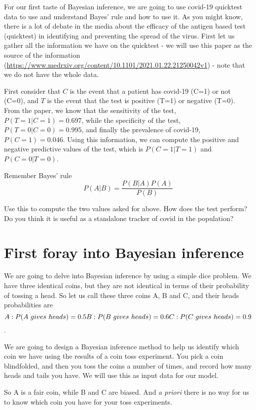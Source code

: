 \documentclass[
]{book}
\begin{document}
For our first taste of Bayesian inference, we are going to use covid-19 quicktest data to use and understand Bayes' rule and how to use it. As you might know, there is a lot of debate in the media about the efficacy of the antigen based test (quicktest) in identifying and preventing the spread of the virus. First let us gather all the information we have on the quicktest - we will use this paper as the source of the information (\url{https://www.medrxiv.org/content/10.1101/2021.01.22.21250042v1}) - note that we do not have the whole data.

First consider that \(C\) is the event that a patient has covid-19 (C=1) or not (C=0), and \(T\) is the event that the test is positive (T=1) or negative (T=0).
From the paper, we know that the sensitivity of the test, \(P(T=1 | C=1) = 0.697\), while the specificity of the test, \(P(T=0 | C=0) = 0.995\), and finally the prevalence of covid-19, \(P(C=1) = 0.046\). Using this information, we can compute the positive and negative predictive values of the test, which is \(P(C=1 | T=1)\) and \(P(C=0 | T=0)\).

Remember Bayes' rule \[P(A|B) = \frac{P(B|A)P(A)}{P(B)}\]

Use this to compute the two values asked for above. How does the test perform? Do you think it is useful as a standalone tracker of covid in the population?

\hypertarget{first-foray-into-bayesian-inference}{%
\section{First foray into Bayesian inference}\label{first-foray-into-bayesian-inference}}

We are going to delve into Bayesian inference by using a simple dice problem. We have three identical coins, but they are not identical in terms of their probability of tossing a head. So let us call these three coins A, B and C, and their heads probabilities are \[A: P(A~gives~heads) = 0.5 \\B: P(B~gives~heads) =  0.6 \\ C: P(C~gives~heads) = 0.9\].

We are going to design a Bayesian inference method to help us identify which coin we have using the results of a coin toss experiment. You pick a coin blindfolded, and then you toss the coins a number of times, and record how many heads and tails you have. We will use this as input data for our model.

So A is a fair coin, while B and C are biased. And \emph{a priori} there is no way for us to know which coin you have for your toss experiments.
\end{document}
